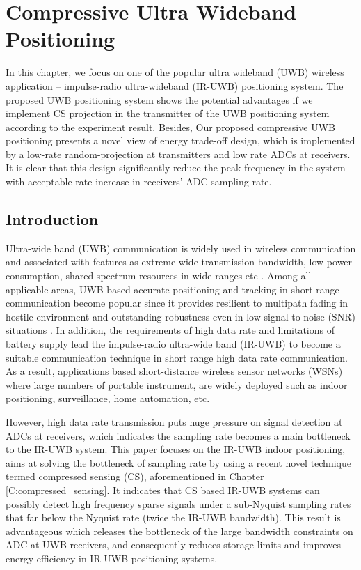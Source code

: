 \chapter{Compressive Ultra Wideband Positioning}\label{C:compressive_uwb_positioning}
In this chapter, we focus on one of the popular ultra wideband (UWB) wireless application -- impulse-radio ultra-wideband (IR-UWB) positioning system. The proposed UWB positioning system shows the potential advantages if we implement CS projection in the transmitter of the UWB positioning system according to the experiment result. Besides, Our proposed compressive UWB positioning presents a novel view of energy trade-off design, which is implemented by a low-rate random-projection at transmitters and low rate ADCs at receivers. It is clear that this design significantly reduce the peak frequency in the system with acceptable rate increase in receivers' ADC sampling rate.   

\section{Introduction}

Ultra-wide band (UWB) communication is widely used in wireless communication and associated with features as extreme wide transmission bandwidth, low-power consumption, shared spectrum resources in wide ranges etc \cite{paredes2007ultra}. Among all applicable areas, UWB based accurate positioning and tracking in short range communication become popular since it provides resilient to multipath fading in hostile environment and outstanding robustness even in low signal-to-noise (SNR) situations \cite{cassioli2002ultra}. In addition, the requirements of high data rate and limitations of battery supply lead the impulse-radio ultra-wide band (IR-UWB) to become a suitable communication technique in short range high data rate communication. As a result, applications based short-distance wireless sensor networks (WSNs) where large numbers of portable instrument, are widely deployed such as indoor positioning, surveillance, home automation, etc. 

However, high data rate transmission puts huge pressure on signal detection at ADCs at receivers, which indicates the sampling rate becomes a main bottleneck to the IR-UWB system. This paper focuses on the IR-UWB indoor positioning, aims at solving the bottleneck of sampling rate by using a recent novel technique termed compressed sensing (CS), aforementioned in Chapter \ref{C:compressed_sensing}. It indicates that CS based IR-UWB systems can possibly detect high frequency sparse signals under a sub-Nyquist sampling rates that far below the Nyquist rate (twice the IR-UWB bandwidth). This result is advantageous which releases the bottleneck of the large bandwidth constraints on ADC at UWB receivers, and consequently reduces storage limits and improves energy efficiency in IR-UWB positioning systems.


